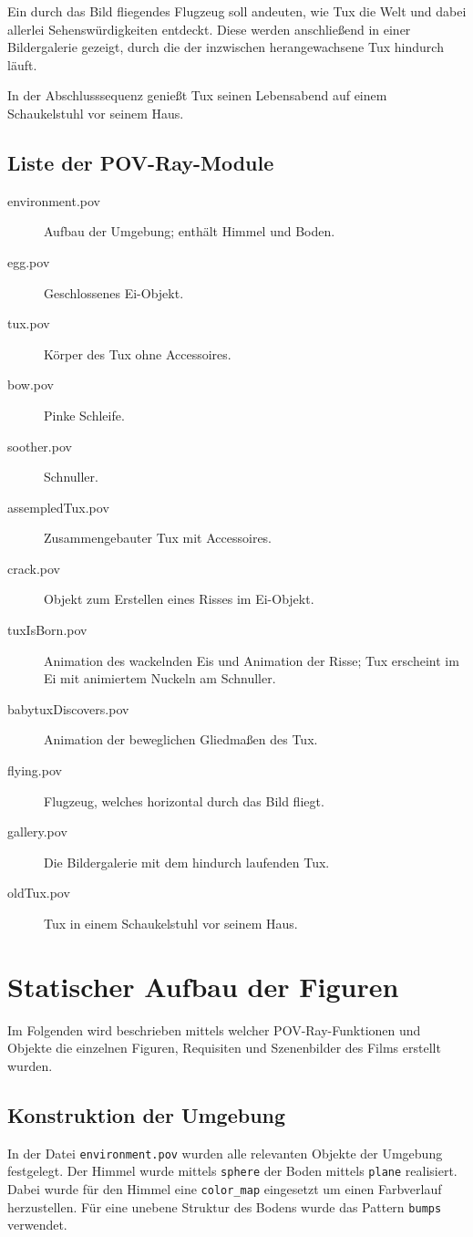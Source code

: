 \documentclass[11pt,parskip]{scrartcl}
\begin{document}
Ein durch das Bild fliegendes Flugzeug soll andeuten, wie Tux die
Welt und dabei allerlei Sehenswürdigkeiten entdeckt. Diese werden anschließend
in einer Bildergalerie gezeigt, durch die der inzwischen herangewachsene Tux
hindurch läuft.

In der Abschlusssequenz genießt Tux seinen Lebensabend auf einem Schaukelstuhl
vor seinem Haus.


\subsection{Liste der POV-Ray-Module}

\begin{description}
  \item [environment.pov] Aufbau der Umgebung; enthält Himmel und Boden.
  \item [egg.pov] Geschlossenes Ei-Objekt.
  \item [tux.pov] Körper des Tux ohne Accessoires.
  \item [bow.pov] Pinke Schleife.
  \item [soother.pov] Schnuller.
  \item [assempledTux.pov] Zusammengebauter Tux mit Accessoires.
  \item [crack.pov] Objekt zum Erstellen eines Risses im Ei-Objekt.
  \item [tuxIsBorn.pov] Animation des wackelnden Eis und Animation der
    Risse; Tux erscheint im Ei mit animiertem Nuckeln am Schnuller.
  \item [babytuxDiscovers.pov] Animation der beweglichen Gliedmaßen des Tux.
  \item [flying.pov] Flugzeug, welches horizontal durch das Bild fliegt.
  \item [gallery.pov] Die Bildergalerie mit dem hindurch laufenden Tux.
  \item [oldTux.pov] Tux in einem Schaukelstuhl vor seinem Haus.
\end{description}


\newpage


\section{Statischer Aufbau der Figuren}
Im Folgenden wird beschrieben mittels welcher POV-Ray-Funktionen und Objekte die
einzelnen Figuren, Requisiten und Szenenbilder des Films erstellt wurden.


\subsection{Konstruktion der Umgebung}
In der Datei \texttt{environment.pov} wurden alle relevanten Objekte der Umgebung
festgelegt. Der Himmel wurde mittels \texttt{sphere} der Boden mittels
\texttt{plane} realisiert. Dabei wurde für den Himmel eine \texttt{color\_map}
eingesetzt um einen Farbverlauf herzustellen. Für eine unebene Struktur des
Bodens wurde das Pattern \texttt{bumps} verwendet.
\end{document}

